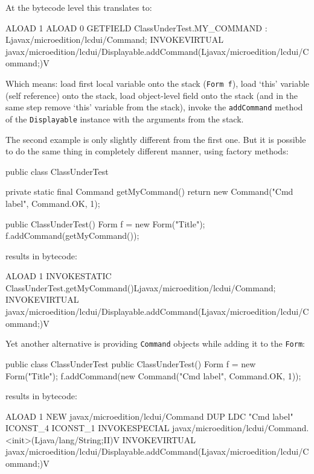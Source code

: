 \noindent%
At the bytecode level this translates to:

\begin{javablock}
ALOAD 1
ALOAD 0
GETFIELD ClassUnderTest.MY_COMMAND : Ljavax/microedition/lcdui/Command;
INVOKEVIRTUAL javax/microedition/lcdui/Displayable.addCommand(Ljavax/microedition/lcdui/Command;)V
\end{javablock}

\noindent%
Which means: load first local variable onto the stack (\texttt{Form f}), load `this' variable (self reference) onto the stack,
load object-level field onto the stack (and in the same step remove `this' variable from the stack),
invoke the \texttt{addCommand} method of the \texttt{Displayable} instance with the arguments from the stack.

The second example is only slightly different from the first one. But it is possible to do the same thing in
completely different manner, using factory methods:

\begin{javablock}
public class ClassUnderTest {
    private static final Command getMyCommand() {
        return new Command("Cmd label", Command.OK, 1);
    }

    public ClassUnderTest() {
        Form f = new Form("Title");
        f.addCommand(getMyCommand());
    }
}
\end{javablock}

\noindent%
results in bytecode:

\begin{javablock}
ALOAD 1
INVOKESTATIC ClassUnderTest.getMyCommand()Ljavax/microedition/lcdui/Command;
INVOKEVIRTUAL javax/microedition/lcdui/Displayable.addCommand(Ljavax/microedition/lcdui/Command;)V
\end{javablock}

\noindent%
Yet another alternative is providing \texttt{Command} objects while adding it 
to the \texttt{Form}:

\begin{javablock}
public class ClassUnderTest {
    public ClassUnderTest() {
        Form f = new Form("Title");
        f.addCommand(new Command("Cmd label", Command.OK, 1));
    }
}
\end{javablock}

\noindent%
results in bytecode:

\begin{javablock}
ALOAD 1
NEW javax/microedition/lcdui/Command
DUP
LDC "Cmd label"
ICONST_4
ICONST_1
INVOKESPECIAL javax/microedition/lcdui/Command.<init>(Ljava/lang/String;II)V
INVOKEVIRTUAL javax/microedition/lcdui/Displayable.addCommand(Ljavax/microedition/lcdui/Command;)V
\end{javablock}

